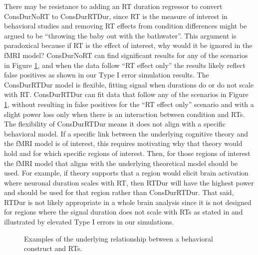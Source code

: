 \documentclass[sn-mathphys,Numbered, super, referee, lineno]{sn-jnl}
\begin{document}
There may be resistance to adding an RT duration regressor to convert ConsDurNoRT to ConsDurRTDur, since RT is the measure of interest in behavioral studies and removing RT effects from condition differences might be argued to be ``throwing the baby out with the bathwater''.  This argument is paradoxical because if RT is the effect of interest, why would it be ignored in the fMRI model?  ConsDurNoRT can find significant results for any of the scenarios in Figure \ref{fig:underlying-theory}, and when the data follow ``RT effect only'' the results likely reflect false positives as shown in our Type I error simulation results.  The ConsDurRTDur model is flexible, fitting signal when durations do or do not scale with RT. ConsDurRTDur can fit data that follow any of the scenarios in Figure \ref{fig:underlying-theory}, without resulting in false positives for the ``RT effect only'' scenario and with a slight power loss only when there is an interaction between condition and RTs.  The flexibility of ConsDurRTDur means it does not align with a specific behavioral model. If a specific link between the underlying cognitive theory and the fMRI model is of interest, this requires motivating why that theory would hold and for which specific regions of interest.  Then, for those regions of interest the fMRI model that aligns with the underlying theoretical model should be used.  For example, if theory supports that a region would elicit brain activation where neuronal duration scales with RT, then RTDur will have the highest power and should be used for that region rather than ConsDurRTDur.  That said, RTDur is not likely appropriate in a whole brain analysis since it is not designed for regions where the signal duration does not scale with RTs as stated in \cite{grinband_detection_2008} and illustrated by elevated Type I errors in our simulations. 




\begin{figure}[ht!]
  \centering
    \caption{Examples of the underlying relationship between a behavioral construct and RTs.}
  \label{fig:underlying-theory}
\end{figure}
\end{document}
